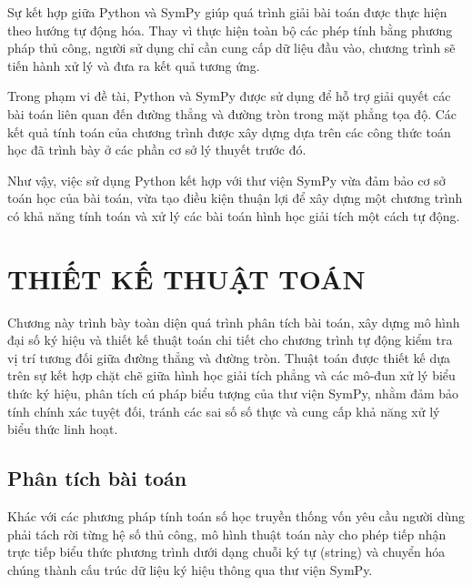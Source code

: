 \documentclass[12pt,a4paper]{article}
\begin{document}
Sự kết hợp giữa Python và SymPy giúp quá trình giải bài toán được thực hiện theo hướng tự động hóa. Thay vì thực hiện toàn bộ các phép tính bằng phương pháp thủ công, người sử dụng chỉ cần cung cấp dữ liệu đầu vào, chương trình sẽ tiến hành xử lý và đưa ra kết quả tương ứng.

Trong phạm vi đề tài, Python và SymPy được sử dụng để hỗ trợ giải quyết các bài toán liên quan đến đường thẳng và đường tròn trong mặt phẳng tọa độ. Các kết quả tính toán của chương trình được xây dựng dựa trên các công thức toán học đã trình bày ở các phần cơ sở lý thuyết trước đó.

Như vậy, việc sử dụng Python kết hợp với thư viện SymPy vừa đảm bảo cơ sở toán học của bài toán, vừa tạo điều kiện thuận lợi để xây dựng một chương trình có khả năng tính toán và xử lý các bài toán hình học giải tích một cách tự động.



\newpage

\section{ THIẾT KẾ THUẬT TOÁN}

Chương này trình bày toàn diện quá trình phân tích bài toán, xây dựng mô hình đại số ký hiệu và thiết kế thuật toán chi tiết cho chương trình tự động kiểm tra vị trí tương đối giữa đường thẳng và đường tròn. Thuật toán được thiết kế dựa trên sự kết hợp chặt chẽ giữa hình học giải tích phẳng và các mô-đun xử lý biểu thức ký hiệu, phân tích cú pháp biểu tượng của thư viện SymPy, nhằm đảm bảo tính chính xác tuyệt đối, tránh các sai số số thực và cung cấp khả năng xử lý biểu thức linh hoạt.

\subsection{Phân tích bài toán}

Khác với các phương pháp tính toán số học truyền thống vốn yêu cầu người dùng phải tách rời từng hệ số thủ công, mô hình thuật toán này cho phép tiếp nhận trực tiếp biểu thức phương trình dưới dạng chuỗi ký tự (string) và chuyển hóa chúng thành cấu trúc dữ liệu ký hiệu thông qua thư viện SymPy.
\end{document}
